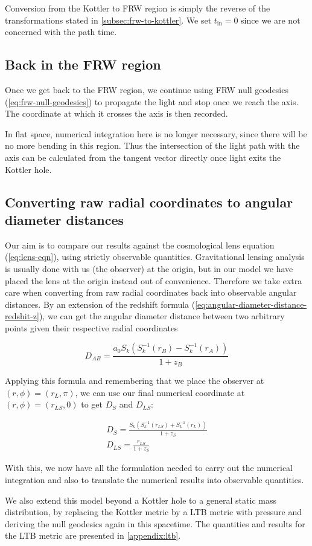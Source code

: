 Conversion from the Kottler to FRW region is simply the reverse of the transformations stated in \autoref{subsec:frw-to-kottler}. We set $t_{\text{in}} = 0$ since we are not concerned with the path time. 

\subsection{Back in the FRW region}

Once we get back to the FRW region, we continue using FRW null geodesics (\autoref{eq:frw-null-geodesics}) to propagate the light and stop once we reach the axis. The coordinate at which it crosses the axis is then recorded. 

In flat space, numerical integration here is no longer necessary, since there will be no more bending in this region. Thus the intersection of the light path with the axis can be calculated from the tangent vector directly once light exits the Kottler hole. 

\subsection{Converting raw radial coordinates to angular diameter distances}

Our aim is to compare our results against the cosmological lens equation (\autoref{eq:lens-eqn}), using strictly observable quantities. Gravitational lensing analysis is usually done with us (the observer) at the origin, but in our model we have placed the lens at the origin instead out of convenience. Therefore we take extra care when converting from raw radial coordinates back into observable angular distances. By an extension of the redshift formula (\autoref{eq:angular-diameter-distance-redshit-z}), we can get the angular diameter distance between two arbitrary points given their respective radial coordinates \citep{peacock1999cosmological}

\begin{equation}
  D_{AB} = \frac{a_0  S_k(S_k^{-1}(r_B) - S_k^{-1}(r_A))}{1+z_B}
\end{equation}

Applying this formula and remembering that we place the observer at $(r, \phi) = (r_L, \pi)$, we can use our final numerical coordinate at $(r, \phi) = (r_{LS}, 0)$ to get $D_S$ and $D_{LS}$:

\begin{subequations}
  \begin{gather}
    D_{S} = \frac{S_k(S_k^{-1}(r_{LS}) + S_k^{-1}(r_L))}{1+z_S}\\
    D_{LS} = \frac{r_{LS}}{1+z_S}
  \end{gather}
\end{subequations}

With this, we now have all the formulation needed to carry out the numerical integration and also to translate the numerical results into observable quantities. 

We also extend this model beyond a Kottler hole to a general static mass distribution, by replacing the Kottler metric by a LTB metric with pressure and deriving the null geodesics again in this spacetime. The quantities and results for the LTB metric are presented in \autoref{appendix:ltb}.